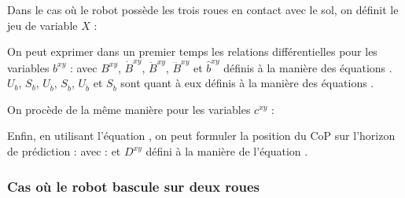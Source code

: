 				Dans le cas où le robot possède les trois roues en contact avec le sol, on définit le jeu de variable $X$ :
				
				On peut exprimer dans un premier temps les relations différentielles pour les variables $b^{xy}$ :
				avec $B^{xy}$, $\dot{B}^{xy}$, $\ddot{B}^{xy}$, $\dddot{B}^{xy}$ et $\hat{b}^{xy}$ définis 
				à la manière des équations .
				$U_b$, $S_b$, $U_{\dot{b}}$, $S_{\dot{b}}$, $U_{\ddot{b}}$ et $S_{\ddot{b}}$ sont quant à eux définis à la manière des équations 
				.
				
				On procède de la même manière pour les variables $c^{xy}$ :
				
				Enfin, en utilisant l'équation , on peut formuler la position du CoP sur l'horizon de prédiction :
				avec :
				et $D^{xy}$ défini à la manière de l'équation .
				
			\subsubsection{Cas où le robot bascule sur deux roues}
			
